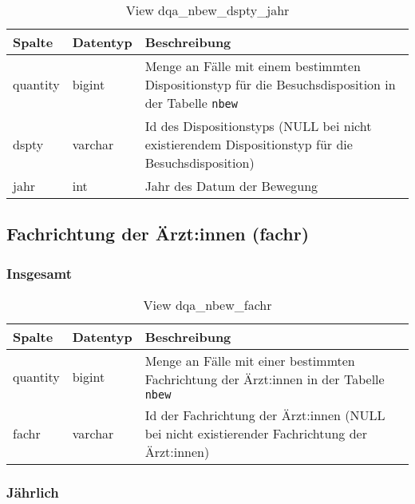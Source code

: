 \begin{table}[ht]
	\centering   
	\caption{View dqa\_nbew\_dspty\_jahr}
	\label{tab:bewDsptyJ}
	\begin{tabular}{||l|l|p{10cm}||}   		
		\hline
		Spalte & Datentyp & Beschreibung \\ [0.5ex]
		\hline\hline
		quantity & bigint & Menge an Fälle mit einem bestimmten Dispositionstyp für die Besuchsdisposition in der Tabelle \texttt{nbew}\\
		\hline
		dspty & varchar & Id des Dispositionstyps (NULL bei nicht existierendem Dispositionstyp für die Besuchsdisposition)\\
		\hline
		jahr & int &  Jahr des Datum der Bewegung \\
		\hline		
	\end{tabular}
\end{table}

\subsection{Fachrichtung der Ärzt:innen (fachr)} \label{subsec:bewFachr}

\subsubsection{Insgesamt} \label{subsubsec:bewFachrI}

\begin{table}[ht]
	\centering   
	\caption{View dqa\_nbew\_fachr}
	\label{tab:bewFachrI}
	\begin{tabular}{||l|l|p{10cm}||}   		
		\hline
		Spalte & Datentyp & Beschreibung \\ [0.5ex]
		\hline\hline
		quantity & bigint & Menge an Fälle mit einer bestimmten Fachrichtung der Ärzt:innen in der Tabelle \texttt{nbew} \\
		\hline
		fachr & varchar & Id der Fachrichtung der Ärzt:innen (NULL bei nicht existierender Fachrichtung der Ärzt:innen)\\
		\hline
		
	\end{tabular}
\end{table}

\subsubsection{Jährlich} \label{subsubsec:bewFachrJ}

